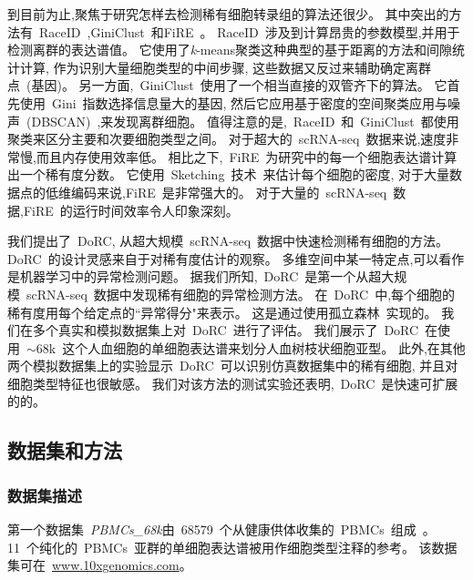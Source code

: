 到目前为止,聚焦于研究怎样去检测稀有细胞转录组的算法还很少。
其中突出的方法有~RaceID~\cite{grun2015single},GiniClust~\cite{jiang2016giniclust}和FiRE~\cite{jindal2018discovery}。
RaceID~涉及到计算昂贵的参数模型,并用于检测离群的表达谱值。
它使用了\textit{k}-means聚类这种典型的基于距离的方法和间隙统计计算,
作为识别大量细胞类型的中间步骤,
这些数据又反过来辅助确定离群点~(基因)。
另一方面,~GiniClust~使用了一个相当直接的双管齐下的算法。
它首先使用~Gini~指数选择信息量大的基因,
然后它应用基于密度的空间聚类应用与噪声~(DBSCAN)~\cite{ester1996density},来发现离群细胞。
值得注意的是,~RaceID~和~GiniClust~都使用聚类来区分主要和次要细胞类型之间。
对于超大的~scRNA-seq~数据来说,速度非常慢,而且内存使用效率低。
相比之下,~FiRE~为研究中的每一个细胞表达谱计算出一个稀有度分数。
它使用~Sketching~技术~\cite{wang2007sizing}来估计每个细胞的密度,
对于大量数据点的低维编码来说,FiRE~是非常强大的。
对于大量的~scRNA-seq~数据,FiRE~的运行时间效率令人印象深刻。

我们提出了~DoRC,
从超大规模~scRNA-seq~数据中快速检测稀有细胞的方法。
DoRC~的设计灵感来自于对稀有度估计的观察。
多维空间中某一特定点,可以看作是机器学习中的异常检测问题。
据我们所知,~DoRC~是第一个从超大规模~scRNA-seq~数据中发现稀有细胞的异常检测方法。
在~DoRC~中,每个细胞的稀有度用每个给定点的``异常得分"来表示。
这是通过使用孤立森林~\cite{liu2008isolation}实现的。
我们在多个真实和模拟数据集上对~DoRC~进行了评估。
我们展示了~DoRC~在使用~${\sim}68$k~这个人血细胞的单细胞表达谱来划分人血树枝状细胞亚型。
此外,在其他两个模拟数据集上的实验显示~DoRC~可以识别仿真数据集中的稀有细胞,
并且对细胞类型特征也很敏感。
我们对该方法的测试实验还表明,~DoRC~是快速可扩展的的。

\subsection{数据集和方法}
\label{sec:method}

\subsubsection{数据集描述}
\label{subsec:datasets} 
第一个数据集~\textit{PBMCs\_68k}由~68579~个从健康供体收集的~PBMCs~组成~\cite{zheng2017massively}。
11~个纯化的~PBMCs~亚群的单细胞表达谱被用作细胞类型注释的参考。
该数据集可在~\url{www.10xgenomics.com}。


